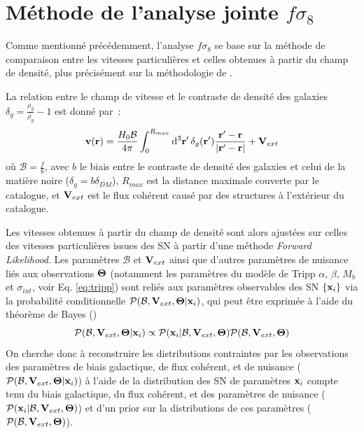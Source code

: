 \documentclass{book}
\let\mcl\mathcal
\let\ov\overline
\begin{document}
\section{Méthode de l'analyse jointe $f\sigma_8$}
\label{anx:fs8}

Comme mentionné précédemment, l'analyse $f\sigma_8$ se base sur la méthode de comparaison entre les vitesses particulières et celles obtenues à partir du champ de densité, plus précisément sur la méthodologie de \cite{stahl_peculiar-velocity_2021}.

La relation entre le champ de vitesse et le contraste de densité des galaxies $\delta_g = \frac{\rho_g}{\ov{\rho_g}} - 1$ est donné par~:
\begin{equation}
    \vb v (\vb r) = \frac{H_0 \mcl B}{4 \pi} \int_0^{R_{max}} \dd[3]{\vb r'} \delta_g(\vb r') \frac{\vb r' - \vb r}{\abs{\vb r' - \vb r}} + \vb V_{ext}
\end{equation}
où $\mcl B =\frac{f}{b}$, avec $b$ le biais entre le contraste de densité des galaxies et celui de la matière noire ($\delta_g = b \delta_{DM}$), $R_{max}$ est la distance maximale couverte par le catalogue, et $\vb V_{ext}$ est le flux cohérent causé par des structures à l'extérieur du catalogue.

Les vitesses obtenues à partir du champ de densité sont alors ajustées sur celles des vitesses particulières issues des SN à partir d'une méthode \textit{Forward Likelihood}. Les paramètres $\mcl B$ et $\vb V_{ext}$ ainsi que d'autres paramètres de nuisance liés aux observations $\vb \Theta$ (notamment les paramètres du modèle de Tripp $\alpha$, $\beta$, $M_b$ et $\sigma_{int}$, voir Eq. \ref{eq:tripp}) sont reliés aux paramètres observables des SN $\{\vb x_i\}$ via la probabilité conditionnelle $\mcl P(\mcl B, \vb V_{ext}, \vb \Theta | \vb x_i)$, qui peut être exprimée à l'aide du théorème de Bayes (\cite{stahl_peculiar-velocity_2021})
\begin{equation}
    \mcl P(\mcl B, \vb V_{ext}, \vb \Theta | \vb x_i) \propto \mcl P(\vb x_i|\mcl B, \vb V_{ext}, \vb \Theta) \mcl P(\mcl B, \vb V_{ext}, \vb \Theta)
\end{equation}
On cherche donc à reconstruire les distributions contraintes par les observations des paramètres de biais galactique, de flux cohérent, et de nuisance ($\mcl P(\mcl B, \vb V_{ext}, \vb \Theta | \vb x_i)$) à l'aide de la distribution des SN de paramètres  $\vb x_i$ compte tenu du biais galactique, du flux cohérent, et des paramètres de nuisance ($\mcl P(\vb x_i | \mcl B, \vb V_{ext}, \vb \Theta )$)  et d'un prior sur la distributions de ces paramètres ($\mcl P(\mcl B, \vb V_{ext}, \vb \Theta)$).
\end{document}
